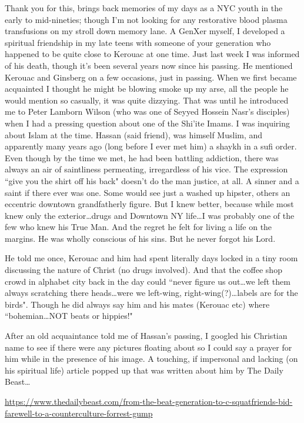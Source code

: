 \begin{footnotesize}
\begin{sffamily}
Thank you for this, brings back memories of my days as a NYC youth in the early to mid-nineties; though I'm not looking for any restorative blood plasma transfusions on my stroll down memory lane. A GenXer myself, I developed a spiritual friendship in my late teens with someone of your generation who happened to be quite close to Kerouac at one time. Just last week I was informed of his death, though it's been several years now since his passing. He mentioned Kerouac and Ginsberg on a few occasions, just in passing. When we first became acquainted I thought he might be blowing smoke up my arse, all the people he would mention so casually, it was quite dizzying. That was until he introduced me to Peter Lamborn Wilson (who was one of Seyyed Hossein Nasr's disciples) when I had a pressing question about one of the Shi'ite Imams. I was inquiring about Islam at the time. Hassan (said friend), was himself Muslim, and apparently many years ago (long before I ever met him) a shaykh in a sufi order. Even though by the time we met, he had been battling addiction, there was always an air of saintliness permeating, irregardless of his vice. The expression ``give you the shirt off his back" doesn't do the man justice, at all. A sinner and a saint if there ever was one. Some would see just a washed up hipster, others an eccentric downtown grandfatherly figure. But I knew better, because while most knew only the exterior…drugs and Downtown NY life…I was probably one of the few who knew his True Man. And the regret he felt for living a life on the margins. He was wholly conscious of his sins. But he never forgot his Lord. 

He told me once, Kerouac and him had spent literally days locked in a tiny room discussing the nature of Christ (no drugs involved). And that the coffee shop crowd in alphabet city back in the day could ``never figure us out…we left them always scratching there heads…were we left-wing, right-wing(?)…labels are for the birds". Though he did always say him and his mates (Kerouac etc) where ``bohemian…NOT beats or hippies!"

After an old acquaintance told me of Hassan's passing, I googled his Christian name to see if there were any pictures floating about so I could say a prayer for him while in the presence of his image. A touching, if impersonal and lacking (on his spiritual life) article popped up that was written about him by The Daily Beast… 

\url{https://www.thedailybeast.com/from-the-beat-generation-to-c-squatfriends-bid-farewell-to-a-counterculture-forrest-gump}


\end{sffamily}
\end{footnotesize}
